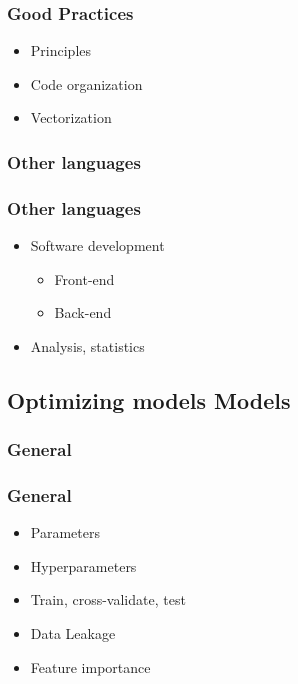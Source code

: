 \begin{frame}\frametitle{Good Practices}
   \begin{itemize}
      \item Principles
      \item Code organization
      \item Vectorization
   \end{itemize}
\end{frame}


\subsubsection{Other languages}

\begin{frame}\frametitle{Other languages}
   \begin{itemize}
      \item Software development
      \begin{itemize}
         \item Front-end
         \item Back-end
      \end{itemize}
      \item Analysis, statistics
   \end{itemize}
\end{frame}





\subsection{Optimizing models Models}

\subsubsection{General}

\begin{frame}\frametitle{General}
   \begin{itemize}
      \item Parameters
      \item Hyperparameters
      \item Train, cross-validate, test
      \item Data Leakage
      \item Feature importance
   \end{itemize}
\end{frame}


